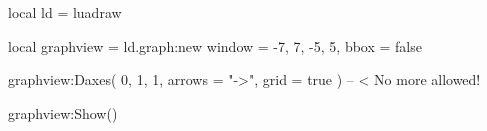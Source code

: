 \documentclass[border = 3pt]{standalone}
\begin{document}
\begin{luadraw}{}
local ld = luadraw

local graphview = ld.graph:new{
  window = {-7, 7, -5, 5},
  bbox   = false
}

graphview:Daxes(
  {0, 1, 1},
  {
    arrows = "->",
    grid   = true
  }
)  -- < No more allowed!

graphview:Show()
\end{luadraw}
\end{document}
